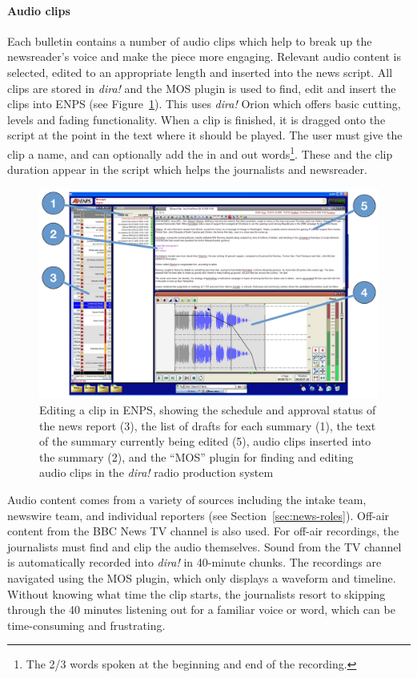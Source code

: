 \paragraph{Audio clips}\label{sec:news-clips}
Each bulletin contains a number of audio clips which help to break up the newsreader's voice and make the piece more
engaging.  Relevant audio content is selected, edited to an appropriate length and inserted into the news script.  All
clips are stored in \textit{dira!} and the MOS plugin is used to find, edit and insert the clips into ENPS (see
Figure~\ref{fig:news-enps-edit}).  This uses \textit{dira!} Orion which offers basic cutting, levels and fading
functionality. When a clip is finished, it is dragged onto the script at the point in the text where it should be
played. The user must give the clip a name, and can optionally add the in and out words\footnote{The 2/3 words spoken
  at the beginning and end of the recording.}. These and the clip duration appear in the script which helps the
journalists and newsreader.

\begin{figure}[ht]
  \centering
  \includegraphics[width=\columnwidth]{figs/news-enps-labelled.pdf}
  \caption{Editing a clip in ENPS, showing the schedule and approval status of the news report (3), the list of drafts for each summary (1), the text of the summary currently being edited (5), audio clips inserted into the summary (2), and the ``MOS'' plugin for finding and editing audio clips in the \textit{dira!} radio production system}
  \label{fig:news-enps-edit}
\end{figure}

Audio content comes from a variety of sources including the intake team, newswire team, and individual reporters (see
Section~\ref{sec:news-roles}).  Off-air content from the BBC News TV channel is also used.  For off-air recordings, the
journalists must find and clip the audio themselves. Sound from the TV channel is automatically recorded into
\textit{dira!} in 40-minute chunks. The recordings are navigated using the MOS plugin, which only displays a waveform
and timeline. Without knowing what time the clip starts, the journalists resort to skipping through the 40 minutes
listening out for a familiar voice or word, which can be time-consuming and frustrating.

